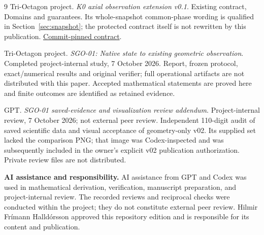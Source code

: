\documentclass[11pt,a4paper]{article}
\begin{document}
\begin{thebibliography}{9}
Tri-Octagon project. \emph{K0 axial observation extension v0.1}. Existing contract, Domains and guarantees. Its whole-snapshot common-phase wording is qualified in Section~\ref{sec:snapshot}; the protected contract itself is not rewritten by this publication. \href{https://github.com/pzychozen/trioctagon-physics/blob/dd6c83cbf5bab228ea4fa4c2b90384d8b70f9772/kernel_physics/K0_AXIAL_OBSERVATION_EXTENSION_v0.1.md}{Commit-pinned contract}.

Tri-Octagon project. \emph{SGO-01: Native state to existing geometric observation}. Completed project-internal study, 7 October 2026. Report, frozen protocol, exact/numerical results and original verifier; full operational artifacts are not distributed with this paper. Accepted mathematical statements are proved here and finite outcomes are identified as retained evidence.

GPT. \emph{SGO-01 saved-evidence and visualization review addendum}. Project-internal review, 7 October 2026; not external peer review. Independent 110-digit audit of saved scientific data and visual acceptance of geometry-only v02. Its supplied set lacked the comparison PNG; that image was Codex-inspected and was subsequently included in the owner's explicit v02 publication authorization. Private review files are not distributed.
\end{thebibliography}

\vfill
\noindent\textbf{AI assistance and responsibility.} AI assistance from GPT and Codex was used in mathematical derivation, verification, manuscript preparation, and project-internal review. The recorded reviews and reciprocal checks were conducted within the project; they do not constitute external peer review. Hilmir Fr\'imann Halld\'orsson approved this repository edition and is responsible for its content and publication.
\end{document}
